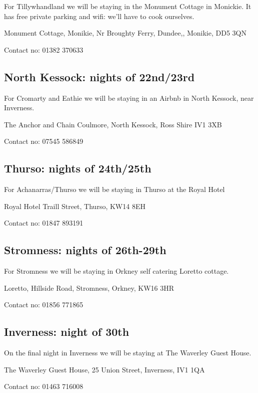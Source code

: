 \documentclass[12pt,letterpaper]{article}
\begin{document}
For Tillywhandland we will be staying in the Monument Cottage in Monickie.  It has free private parking and wifi: we'll have to cook ourselves.

Monument Cottage, 
Monikie, 
Nr Broughty Ferry, 
Dundee,, Monikie, 
DD5 3QN

Contact no: 01382 370633

\subsection{North Kessock: nights of 22nd/23rd}

For Cromarty and Eathie we will be staying in an Airbnb in North Kessock, near Inverness.

The Anchor and Chain Coulmore, 
North Kessock, 
Ross Shire 
IV1 3XB

Contact no: 07545 586849

\subsection{Thurso: nights of 24th/25th}

For Achanarras/Thurso we will be staying in Thurso at the Royal Hotel

Royal Hotel
Traill Street, 
Thurso, 
KW14 8EH

Contact no: 01847 893191

\subsection{Stromness: nights of 26th-29th}

For Stromness we will be staying in Orkney self catering Loretto cottage.

Loretto,
Hillside Road,
Stromness,
Orkney,
KW16 3HR

Contact no: 01856 771865


\subsection{Inverness: night of 30th}

On the final night in Inverness we will be staying at The Waverley Guest House.

The Waverley Guest House,
25 Union Street,
Inverness,
IV1 1QA

Contact no: 01463 716008



\pagebreak
\end{document}
